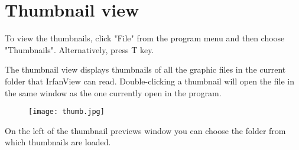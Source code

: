 \documentclass[
	fontsize=10pt, 
	twoside=true, 
	numbers=noenddot, 
]{kaobook}
\begin{document}
\section{Thumbnail view}
\par To view the thumbnails, click "File" from the program menu and then choose "Thumbnails". Alternatively, press T key.
\par The thumbnail view displays thumbnails of all the graphic files in the current folder that IrfanView can read. Double-clicking a thumbnail will open the file in the same window as the one currently open in the program.
\begin{figure}[h]
    \centering
    \texttt{[image: thumb.jpg]}
\end{figure}
\par On the left of the thumbnail previews window you can choose the folder from which thumbnails are loaded.
\end{document}
